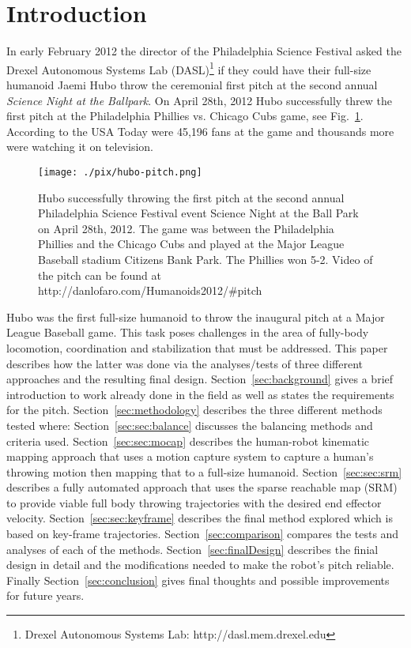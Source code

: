 \section{Introduction}
In early February 2012 the director of the Philadelphia Science Festival asked the Drexel Autonomous Systems Lab (DASL)\footnote{Drexel Autonomous Systems Lab: http://dasl.mem.drexel.edu}\label{foot:dasl} if they could have their full-size humanoid Jaemi Hubo throw the ceremonial first pitch at the second annual \textit{Science Night at the Ballpark}.  
On April 28th, 2012 Hubo successfully threw the first pitch at the Philadelphia Phillies vs. Chicago Cubs game, see Fig.~\ref{fig:hubo-throw}.  According to the USA Today were 45,196 fans at the game and thousands
more were watching it on television.

\begin{figure}[t]
  \centering
\texttt{[image: ./pix/hubo-pitch.png]}
  \caption{Hubo successfully throwing the first pitch at the second annual Philadelphia Science Festival event Science Night at the Ball Park on April 28th, 2012.  The game was between the Philadelphia Phillies and the Chicago Cubs and played at the Major League Baseball stadium Citizens Bank Park.  The Phillies won 5-2.  Video of the pitch can be found at http://danlofaro.com/Humanoids2012/\#pitch}
  \label{fig:hubo-throw}
\end{figure}



Hubo was the first full-size humanoid to throw the inaugural pitch at a Major League Baseball game.  
This task poses challenges in the area of fully-body locomotion, coordination and stabilization that must be addressed.
This paper describes how the latter was done via the analyses/tests of three different approaches and the resulting final design.
Section~\ref{sec:background} gives a brief introduction to work already done in the field as well as states the requirements for the pitch.
Section~\ref{sec:methodology} describes the three different methods tested where:
Section~\ref{sec:sec:balance} discusses the balancing methods and criteria used.
Section~\ref{sec:sec:mocap} describes the human-robot kinematic mapping approach that uses a motion capture system to capture a human's throwing motion then mapping that to a full-size humanoid.  
Section~\ref{sec:sec:srm} describes a fully automated approach that uses the sparse reachable map (SRM) to provide viable full body throwing trajectories with the desired end effector velocity\cite{dlofaro-srm}.
Section~\ref{sec:sec:keyframe} describes the final method explored which is based on key-frame trajectories.
Section~\ref{sec:comparison} compares the tests and analyses of each of the methods.
Section~\ref{sec:finalDesign} describes the finial design in detail and the modifications needed to make the robot's pitch reliable.
Finally Section~\ref{sec:conclusion} gives final thoughts and possible improvements for future years.


